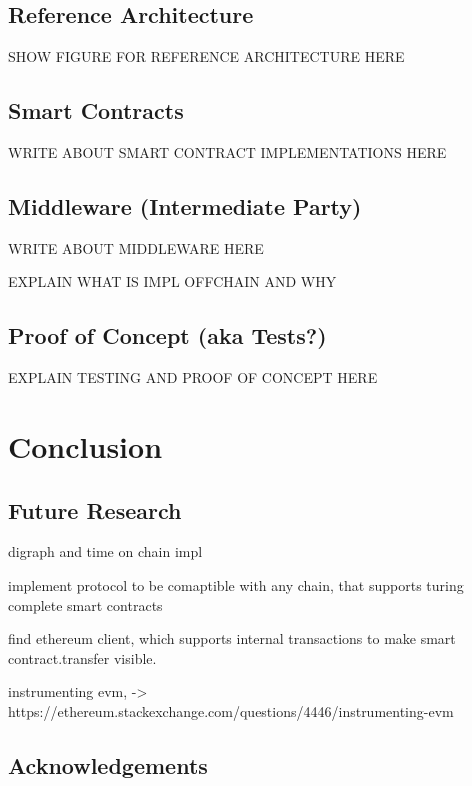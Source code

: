 \section{Reference Architecture}
\label{sec:chapter04:ref_architecture}

SHOW FIGURE FOR REFERENCE ARCHITECTURE HERE
%
%
\section{Smart Contracts}
\label{sec:chapter04:smartcontracts}
WRITE ABOUT SMART CONTRACT IMPLEMENTATIONS HERE

\section{Middleware (Intermediate Party)}
\label{sec:chapter04:middleware}
WRITE ABOUT MIDDLEWARE HERE

EXPLAIN WHAT IS IMPL OFFCHAIN AND WHY

\section{Proof of Concept (aka Tests?)}
\label{sec:chapter04:poc}
EXPLAIN TESTING AND PROOF OF CONCEPT HERE

\chapter{Conclusion}
\label{ch:chapter05}

\section{Future Research}
\label{sec:background:futureresearch}

digraph and time on chain impl

implement protocol to be comaptible with any chain, that supports turing complete smart contracts

find ethereum client, which supports internal transactions to make smart contract.transfer visible.

instrumenting evm, -> https://ethereum.stackexchange.com/questions/4446/instrumenting-evm

\section{Acknowledgements}
\label{sec:background:acknowledgements}


